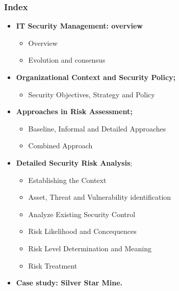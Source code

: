 \documentclass[xcolor ={table,usenames,dvipsnames}]{beamer}
\theoremstyle{definition}
\begin{document}
	\begin{frame}
		\frametitle{Index}
		\begin{itemize}
			\item <1-> \textbf{IT Security Management: overview}
			\begin{itemize}
				\item Overview
				\item Evolution and consensus
			\end{itemize}
			\item <0>  \textbf{Organizational Context and Security Policy;}
			\begin{itemize}
				\item Security Objectives, Strategy and Policy
			\end{itemize}
			\item <0>  \textbf{Approaches in Risk Assessment;}
			\begin{itemize}
				\item Baseline, Informal and Detailed Approaches
				\item Combined Approach
			\end{itemize}
			\item <0> \textbf{Detailed Security Risk Analysis};
			\begin{itemize}
				\item Establishing the Context
				\item Asset, Threat and Vulnerability identification
				\item Analyze Existing Security Control
				\item Risk Likelihood and Concequences
				\item Risk Level Determination and Meaning
				\item Risk Treatment
			\end{itemize}
			\item <0> \textbf{Case study: Silver Star Mine.}
		\end{itemize}
	\end{frame}
\end{document}
